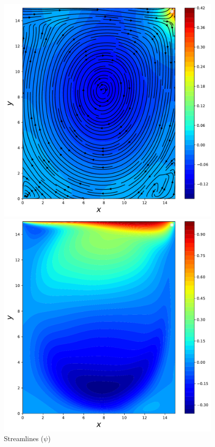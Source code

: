 \documentclass{article}
\begin{document}
\begin{figure}[htb!]
	\includegraphics[width=\linewidth]{./images/Re1500FlowPy_pres_stream}
	\caption{Streamlines ($\psi$)}
	\label{fig:pres_example2}
	\endminipage\hfill
	\includegraphics[width=\linewidth]{./images/Re1500FlowPy_u}

\end{figure}
\end{document}
